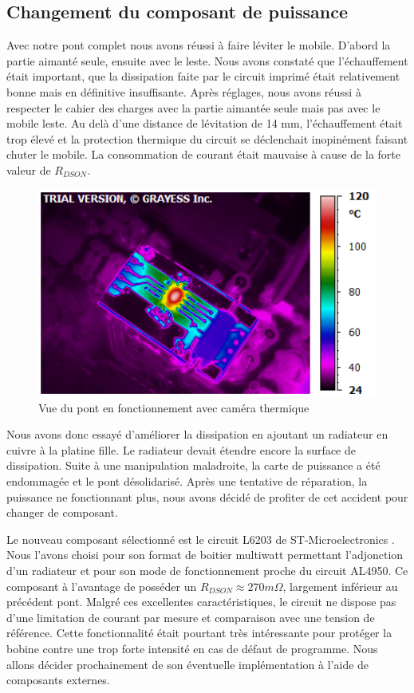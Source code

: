 \documentclass[11pt, french]{article} %
\begin{document}
\subsection{Changement du composant de puissance}
Avec notre pont complet nous avons réussi à faire léviter le mobile. D'abord la partie aimanté seule, ensuite avec le leste. Nous avons constaté que l'échauffement était important, que la dissipation faite par le circuit imprimé était relativement bonne mais en définitive insuffisante. Après réglages, nous avons réussi à respecter le cahier des charges avec la partie aimantée seule mais pas avec le mobile leste. Au delà d'une distance de lévitation de 14 mm, l'échauffement était trop élevé et la protection thermique du circuit se déclenchait inopinément faisant chuter le mobile. La consommation de courant était mauvaise à cause de la forte valeur de $ R_{DSON} $.

\begin{figure}[ht!]
	\centering
	\includegraphics[width = 12cm]{SolutionAnalogique/VueThermique.png}
	\caption{Vue du pont en fonctionnement avec caméra thermique}
\end{figure}

Nous avons donc essayé d'améliorer la dissipation en ajoutant un radiateur en cuivre à la platine fille. Le radiateur devait étendre encore la surface de dissipation. Suite à une manipulation maladroite, la carte de puissance a été endommagée et le pont désolidarisé. Après une tentative de réparation, la puissance ne fonctionnant plus, nous avons décidé de profiter de cet accident pour changer de composant.

\medskip
Le nouveau composant sélectionné est le circuit L6203 de ST-Microelectronics . Nous l'avons choisi pour son format de boitier multiwatt permettant l'adjonction d'un radiateur et pour son mode de fonctionnement proche du circuit AL4950. Ce composant à l'avantage de posséder un $ R_{DSON} \approx 270 m\Omega $, largement inférieur au précédent pont. Malgré ces excellentes caractéristiques, le circuit ne dispose pas d'une limitation de courant par mesure et comparaison avec une tension de référence. Cette fonctionnalité était pourtant très intéressante pour protéger la bobine contre une trop forte intensité en cas de défaut de programme. Nous allons décider prochainement de son éventuelle implémentation à l'aide de composants externes.
\end{document}
